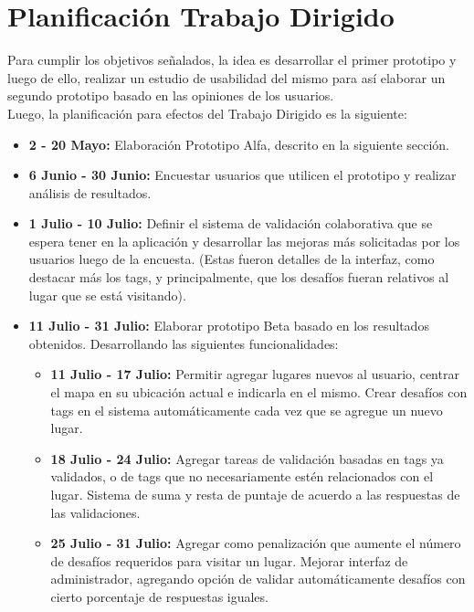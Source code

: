 \documentclass[10pt,letterpaper]{article}
\begin{document}
\newpage
\section{Planificación Trabajo Dirigido}

Para cumplir los objetivos señalados, la idea es desarrollar el primer prototipo y luego de ello, realizar un estudio de usabilidad del mismo para así elaborar un segundo prototipo basado en las opiniones de los usuarios.\\

Luego, la planificación para efectos del Trabajo Dirigido es la siguiente:\\

\begin{itemize}
\item \textbf{2 - 20 Mayo:} Elaboración Prototipo Alfa, descrito en la siguiente sección.
\item \textbf{6 Junio - 30 Junio:} Encuestar usuarios que utilicen el prototipo y realizar análisis de resultados.
\item \textbf{1 Julio - 10 Julio:} Definir el sistema de validación colaborativa que se espera tener en la aplicación y desarrollar las mejoras más solicitadas por los usuarios luego de la encuesta. (Estas fueron detalles de la interfaz, como destacar más los tags, y principalmente, que los desafíos fueran relativos al lugar que se está visitando).
 \item \textbf{11 Julio - 31 Julio:} Elaborar prototipo Beta basado en los resultados obtenidos. Desarrollando las siguientes funcionalidades:
  \begin{itemize}
  \item \textbf{11 Julio - 17 Julio:} Permitir agregar lugares nuevos al usuario, centrar el mapa en su ubicación actual e indicarla en el mismo. Crear desafíos con tags en el sistema automáticamente cada vez que se agregue un nuevo lugar.
  \item \textbf{18 Julio - 24 Julio:} Agregar tareas de validación basadas en tags ya validados, o de tags que no necesariamente estén relacionados con el lugar. Sistema de suma y resta de puntaje de acuerdo a las respuestas de las validaciones.
  \item \textbf{25 Julio - 31 Julio:} Agregar como penalización que aumente el número de desafíos requeridos para visitar un lugar. Mejorar interfaz de administrador, agregando opción de validar automáticamente desafíos con cierto porcentaje de respuestas iguales. 
  \end{itemize}
\end{itemize}
\end{document}
